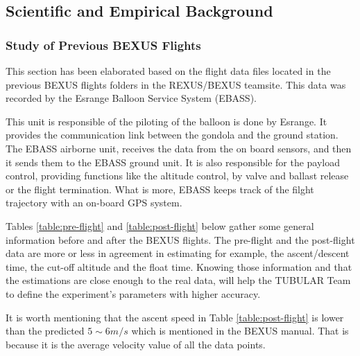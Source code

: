 \subsection{Scientific and Empirical Background}

\subsubsection{Study of Previous BEXUS Flights}
This section has been elaborated based on the flight data files located in the previous BEXUS flights folders in the REXUS/BEXUS teamsite. This data was recorded by the Esrange Balloon Service System (EBASS).

\smallskip
This unit is responsible of the piloting of the balloon is done by Esrange. It provides the communication link between the gondola and the ground station. The EBASS airborne unit, receives the data from the on board sensors, and then it sends them to the EBASS ground unit. It is also responsible for the payload control, providing functions like the altitude control, by valve and ballast release or the flight termination. What is more, EBASS keeps track of the filght trajectory with an on-board GPS system.

\smallskip
Tables \ref{table:pre-flight} and \ref{table:post-flight} below gather some general information before and after the BEXUS flights. The pre-flight and the post-flight data are more or less in agreement in estimating for example, the ascent/descent time, the cut-off altitude and the float time. Knowing those information and that the estimations are close enough to the real data, will help the TUBULAR Team to define the experiment's parameters with higher accuracy. 

\smallskip
It is worth mentioning that the ascent speed in Table \ref{table:post-flight} is lower than the predicted $5\sim 6 m/s$ which is mentioned in the BEXUS manual. That is because it is the average velocity value of all the data points.  

